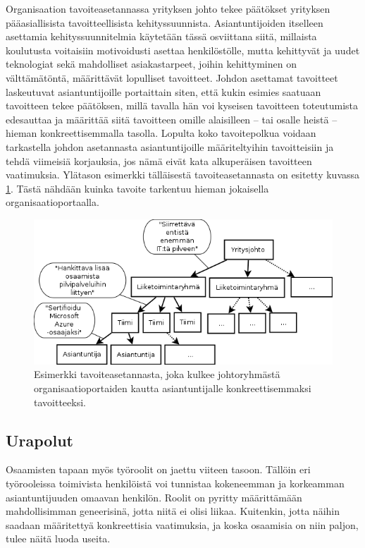\documentclass[a4paper,finnish,12pt]{article}
\begin{document}
Organisaation tavoiteasetannassa yrityksen johto tekee päätökset yrityksen pääasiallisista tavoitteellisista kehityssuunnista. Asiantuntijoiden itselleen asettamia kehityssuunnitelmia käytetään tässä osviittana siitä, millaista koulutusta voitaisiin motivoidusti asettaa henkilöstölle, mutta kehittyvät ja uudet teknologiat sekä mahdolliset asiakastarpeet, joihin kehittyminen on välttämätöntä, määrittävät lopulliset tavoitteet. Johdon asettamat tavoitteet laskeutuvat asiantuntijoille portaittain siten, että kukin esimies saatuaan tavoitteen tekee päätöksen, millä tavalla hän voi kyseisen tavoitteen toteutumista edesauttaa ja määrittää siitä tavoitteen omille alaisilleen -- tai osalle heistä -- hieman konkreettisemmalla tasolla. Lopulta koko tavoitepolkua voidaan tarkastella johdon asetannasta asiantuntijoille määriteltyihin tavoitteisiin ja tehdä viimeisiä korjauksia, jos nämä eivät kata alkuperäisen tavoitteen vaatimuksia. Ylätason esimerkki tälläisestä tavoiteasetannasta on esitetty kuvassa \ref{fig:tavoitesample}. Tästä nähdään kuinka tavoite tarkentuu hieman jokaisella organisaatioportaalla.

\begin{figure}[hb]
\centering
\includegraphics[width=1\textwidth]{tavoitesample.png}
\caption{Esimerkki tavoiteasetannasta, joka kulkee johtoryhmästä organisaatioportaiden kautta asiantuntijalle konkreettisemmaksi tavoitteeksi.}
\label{fig:tavoitesample}
\end{figure}

\subsection{Urapolut}

Osaamisten tapaan myös työroolit on jaettu viiteen tasoon. Tällöin eri työrooleissa toimivista henkilöistä voi tunnistaa kokeneemman ja korkeamman asiantuntijuuden omaavan henkilön. Roolit on pyritty määrittämään mahdollisimman geneerisinä, jotta niitä ei olisi liikaa. Kuitenkin, jotta näihin saadaan määritettyä konkreettisia vaatimuksia, ja koska osaamisia on niin paljon, tulee näitä luoda useita.
\end{document}
